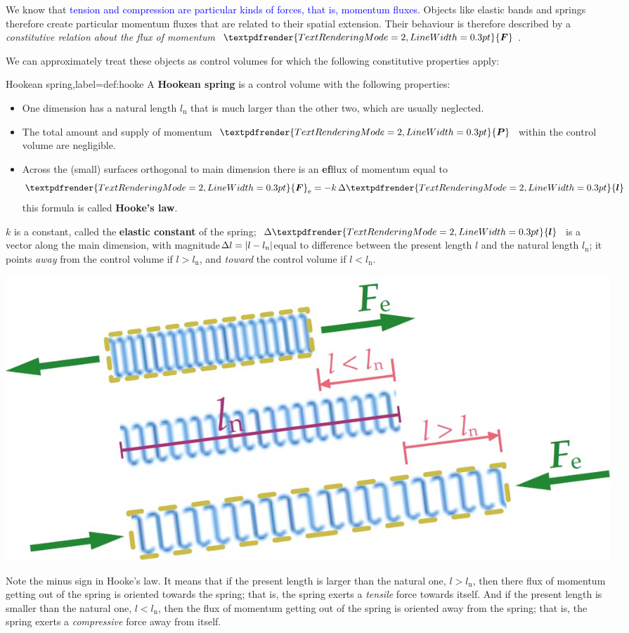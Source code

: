 \documentclass[a4paper,12pt,%
onecolumn,oneside,%
british%
]{memoir}
\renewcommand*{\bm}[1]{\textpdfrender{TextRenderingMode=2,LineWidth=0.3pt}{\boldsymbol{#1}}}
\newcommand*{\incr}{\Delta}%
\DeclarePairedDelimiter\abs{\lvert}{\rvert}
\renewcommand*{\|}[1][]{\nonscript\:#1\vert\nonscript\:\mathopen{}}
\newcommand*{\sect}{\S}%
\renewcommand*{\autoref}[2]{\sidepar{\vspace{-1ex}\footnotesize{\color{blue}\faIcon{%
angle-right%
}\enspace\sect\,\ref{#1} page\,\pageref{#1}}}\textcolor{blue}{#2}}
\newcommand*{\ylo}{l_{\textrm{n}}}
\newcommand*{\yle}{l}
\newcommand*{\ydl}{\incr\bm{l}}
\newcommand*{\ydlm}{\incr l}
\newcommand*{\yP}{\bm{P}}
\newcommand*{\yF}{\bm{F}}
\begin{document}
We know that \autoref{sec:pressure_tension_shear}{tension and compression are particular kinds of forces, that is, momentum fluxes}. Objects like elastic bands and springs therefore create particular momentum fluxes that are related to their spatial extension. Their behaviour is therefore described by a \emph{constitutive relation about the flux of momentum $\yF$}.

We can approximately treat these objects as control volumes for which the following constitutive properties apply:
\begin{definition}{Hookean spring,label={def:hooke}}
  A \textbf{Hookean spring} is a control volume with the following properties:
  \begin{itemize}[shift]
  \item One dimension has a natural length $\ylo$ that is much larger than the other two, which are usually neglected.
  \item The total amount and supply of momentum $\yP$ within the control volume are negligible.
  \item Across the (small) surfaces orthogonal to main dimension there is an \textbf{ef}flux of momentum equal to
    \begin{equation}
      \label{eq:hooke}
      \yF_{\textrm{e}} = -k\,\ydl
    \end{equation}
    this formula is called \textbf{Hooke's law}.
  \end{itemize}
  $k$ is a constant, called the \textbf{elastic constant} of the spring; $\ydl$ is a vector along the main dimension, with magnitude\enspace$\ydlm = \abs{\yle-\ylo}$\enspace equal to difference between the present length $\yle$ and the natural length $\ylo$; it points \emph{away} from the control volume if $\yle>\ylo$, and \emph{toward} the control volume if $\yle<\ylo$.
  \begin{center}
\includegraphics[width=0.67\linewidth]{images/hooke3.jpg}%
  \end{center}
\end{definition}
%
Note the minus sign in Hooke's law. It means that if the present length is larger than the natural one, $\yle > \ylo$, then there flux of momentum getting out of the spring is oriented towards the spring; that is, the spring exerts a \emph{tensile} force towards itself. And if the present length is smaller than the natural one, $\yle < \ylo$, then the flux of momentum getting out of the spring is oriented away from the spring; that is, the spring exerts a \emph{compressive} force away from itself.
\end{document}
